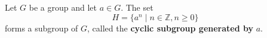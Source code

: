 Let $G$ be a group and let $a \in G$. The set
$$H = \{a^n \mid n \in \mathbb{Z}, n \geq 0\}$$
forms a subgroup of $G$, called the \textbf{cyclic subgroup generated by} $a$.

